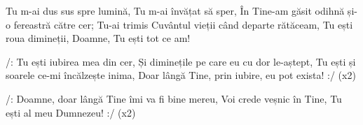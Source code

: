 \beginverse
Tu m-ai dus sus spre lumină, Tu m-ai învățat să sper,
În Tine-am găsit odihnă și-o fereastră către cer;
Tu-ai trimis Cuvântul vieții când departe rătăceam,
Tu ești roua dimineții, Doamne, Tu ești tot ce am!
\endverse

\beginchorus
/: Tu ești iubirea mea din cer,
Și diminețile pe care eu cu dor le-aștept,
Tu ești și soarele ce-mi încălzește inima,
Doar lângă Tine, prin iubire, eu pot exista! :/ (x2)
\endchorus

\beginverse*
/: Doamne, doar lângă Tine îmi va fi bine mereu,
Voi crede veșnic în Tine, Tu ești al meu Dumnezeu! :/ (x2)
\endverse
\endsong